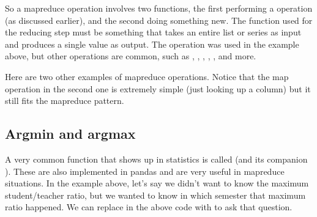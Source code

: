 \documentclass[letterpaper,10pt,english]{jupyterBook}
\begin{document}
\sphinxAtStartPar
So a map\sphinxhyphen{}reduce operation involves two functions, the first performing a  operation (as discussed earlier), and the second doing something new.  The function used for the reducing step must be something that takes an entire list or series as input and produces a single value as output.  The  operation was used in the example above, but other operations are common, such as , , , , , and more.

\sphinxAtStartPar
Here are two other examples of map\sphinxhyphen{}reduce operations.  Notice that the map operation in the second one is extremely simple (just looking up a column) but it still fits the map\sphinxhyphen{}reduce pattern.

\begin{sphinxVerbatim}[commandchars=\\\{\}]
\PYG{p}{[}\PYG{p}{]}  

\PYG{p}{[}\PYG{p}{]}
\end{sphinxVerbatim}


\subsection{Argmin and argmax}
\label{\detokenize{chapter-11-processing-rows:argmin-and-argmax}}
\sphinxAtStartPar
A very common function that shows up in statistics is called  (and its companion ).  These are also implemented in pandas and are very useful in map\sphinxhyphen{}reduce situations.  In the example above, let’s say we didn’t want to know the maximum student/teacher ratio, but we wanted to know in which semester that maximum ratio happened.  We can replace  in the above code with  to ask that question.
\end{document}
